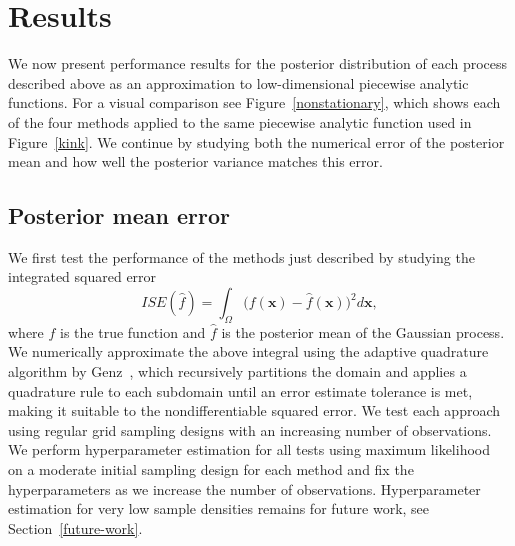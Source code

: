 \documentclass{article}
\renewcommand{\vec}[1]{\mathbf{#1}}
\numberwithin{equation}{section}
\begin{document}
\section{Results}
We now present performance results for the posterior distribution of each process described above as an approximation to low-dimensional piecewise analytic functions. For a visual comparison see Figure~\ref{nonstationary}, which shows each of the four methods applied to the same piecewise analytic function used in Figure~\ref{kink}. We continue by studying both the numerical error of the posterior mean and how well the posterior variance matches this error.

\subsection{Posterior mean error}
We first test the performance of the methods just described by studying the integrated squared error
$$ ISE(\hat{f}) = \int_\Omega \Big(f(\vec{x})- \hat{f}(\vec{x})\Big)^2 d\vec{x}, $$
where $f$ is the true function and $\hat{f}$ is the posterior mean of the Gaussian process. We numerically approximate the above integral using the adaptive quadrature algorithm by Genz~\cite{genz1991adaptive}, which recursively partitions the domain and applies a quadrature rule to each subdomain until an error estimate tolerance is met, making it suitable to the nondifferentiable squared error. We test each approach using regular grid sampling designs with an increasing number of observations. We perform hyperparameter estimation for all tests using maximum likelihood~\cite{rasmussen2003gaussian} on a moderate initial sampling design for each method and fix the hyperparameters as we increase the number of observations. Hyperparameter estimation for very low sample densities remains for future work, see Section~\ref{future-work}.
\end{document}
